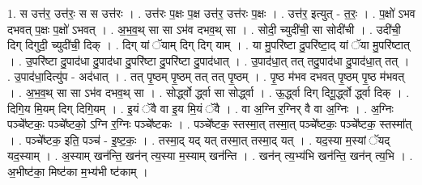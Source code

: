 \documentclass[17pt]{extarticle}
\begin{document}
1. स उत्त॑र॒ उत्त॑रः॒ स स उत्त॑रः । . उत्त॑रः प॒क्षः प॒क्ष उत्त॑र॒ उत्त॑रः प॒क्षः । . उत्त॑र॒ इत्युत् - त॒रः॒ । . प॒क्षो॑ ऽभव दभवत् प॒क्षः प॒क्षो॑ ऽभवत् । . अ॒भ॒व॒थ् सा सा ऽभ॑व दभव॒थ् सा । . सोदी॒ च्युदी॑ची॒ सा सोदी॑ची । . उदी॑ची॒ दिग् दिगुदी॒ च्युदी॑ची॒ दिक् । . दिग् यां ॅयाम् दिग् दिग् याम् । . या मु॒परि॑ष्टा दु॒परि॑ष्टा॒द् यां ॅया मु॒परि॑ष्टात् । . उ॒परि॑ष्टा दु॒पाद॑धा दु॒पाद॑धा दु॒परि॑ष्टा दु॒परि॑ष्टा दु॒पाद॑धात् । . उ॒पाद॑धा॒त् तत् तदु॒पाद॑धा दु॒पाद॑धा॒त् तत् । . उ॒पाद॑धा॒दित्यु॑प - अद॑धात् । . तत् पृ॒ष्ठम् पृ॒ष्ठम् तत् तत् पृ॒ष्ठम् । . पृ॒ष्ठ म॑भव दभवत् पृ॒ष्ठम् पृ॒ष्ठ म॑भवत् । . अ॒भ॒व॒थ् सा सा ऽभ॑व दभव॒थ् सा । . सोर्द्ध्वो र्द्ध्वा सा सोर्द्ध्वा । . ऊ॒र्द्ध्वा दिग् दिगू॒र्द्ध्वो र्द्ध्वा दिक् । . दिगि॒य मि॒यम् दिग् दिगि॒यम् । . इ॒यं ॅवै वा इ॒य मि॒यं ॅवै । . वा अ॒ग्नि र॒ग्निर् वै वा अ॒ग्निः । . अ॒ग्निः पञ्चे᳚ष्टकः॒ पञ्चे᳚ष्टको॒ ऽग्नि र॒ग्निः पञ्चे᳚ष्टकः । . पञ्चे᳚ष्टक॒ स्तस्मा॒त् तस्मा॒त् पञ्चे᳚ष्टकः॒ पञ्चे᳚ष्टक॒ स्तस्मा᳚त् । . पञ्चे᳚ष्टक॒ इति॒ पञ्च॑ - इ॒ष्ट॒कः॒ । . तस्मा॒द् यद् यत् तस्मा॒त् तस्मा॒द् यत् । . यद॒स्या म॒स्यां ॅयद् यद॒स्याम् । . अ॒स्याम् खन॑न्ति॒ खन॑न् त्य॒स्या म॒स्याम् खन॑न्ति । . खन॑न् त्य॒भ्य॑भि खन॑न्ति॒ खन॑न् त्य॒भि । . अ॒भीष्ट॑का॒ मिष्ट॑का म॒भ्य॑भी ष्ट॑काम् । \newline
\end{document}
